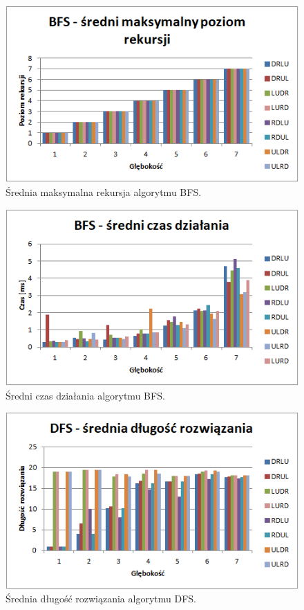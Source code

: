 \documentclass{classrep}
\begin{document}
\begin{figure}[H]
	\centering
		\includegraphics[width=1\textwidth]{Wykresy/4.png}
	\caption{Średnia maksymalna rekursja algorytmu BFS.}
\end{figure}
\begin{figure}[H]
	\centering
		\includegraphics[width=1\textwidth]{Wykresy/5.png}
	\caption{Średni czas działania algorytmu BFS.}
\end{figure}
\begin{figure}[H]
	\centering
		\includegraphics[width=1\textwidth]{Wykresy/6.png}
	\caption{Średnia długość rozwiązania algorytmu DFS.}
\end{figure}
\end{document}
